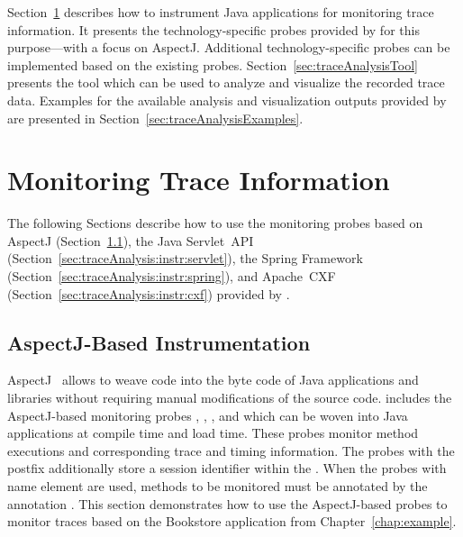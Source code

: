 \enlargethispage{1cm}

\noindent Section~\ref{sec:traceMonitoring} describes how to instrument Java %
applications for monitoring trace information. %
It presents the technology-specific probes provided by \Kieker{} for this %
purpose---with a focus on AspectJ. %
Additional technology-specific probes can be implemented based on the existing %
probes. %
Section~\ref{sec:traceAnalysisTool} presents the %
tool which can be used to analyze and visualize the recorded trace %
data.  Examples for the available analysis and visualization outputs %
provided by \KiekerTraceAnalysis{} are presented in %
Section~\ref{sec:traceAnalysisExamples}.

\section{Monitoring Trace Information}\label{sec:traceMonitoring}

The following Sections describe how to use the monitoring probes based on %
AspectJ (Section~\ref{sec:traceAnalysis:instr:AspectJ}), %
the Java Servlet~API (Section~\ref{sec:traceAnalysis:instr:servlet}), %
the Spring Framework (Section~\ref{sec:traceAnalysis:instr:spring}), and %
Apache~CXF (Section~\ref{sec:traceAnalysis:instr:cxf}) provided %
by \Kieker{}. %

\subsection{AspectJ-Based Instrumentation}\label{sec:traceAnalysis:instr:AspectJ}

AspectJ~\cite{AspectJ-WebSite} allows to weave code into the byte code of %
Java applications and libraries without requiring manual modifications of the %
source code. %
\Kieker{} includes the AspectJ-based monitoring probes %
, %
, %
, and %
which can be woven into Java applications at compile time and load time. %
These probes monitor method executions and corresponding %
trace and timing information. The probes with the postfix  %
additionally store a session identifier within the . %
When the probes with name element  are used, %
methods to be monitored must be annotated by the \Kieker{} %
annotation . %
This section demonstrates how to use the AspectJ-based probes to monitor %
traces based on the Bookstore application from Chapter~\ref{chap:example}. %

